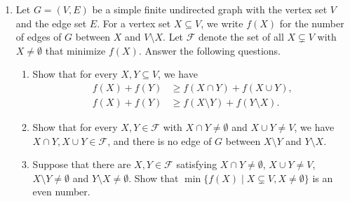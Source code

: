 \documentclass{article}
\begin{document}
\begin{enumerate}[label=\fbox{\arabic*}]
\begin{enumerate}[label=(\arabic*)]
\begin{center}
\begin{minipage}{0.7\textwidth}
\begin{tabbing}
                      \> \textbf{while} $X > 0$ \textbf{do} \\
                      \> \> \textbf{while} $Y > 0$ \textbf{do} \\
                      \> \> \> $Y \leftarrow Y - 1$; $Z \leftarrow Z + 1$; $L \leftarrow \mathbf{cons}(X, \mathbf{cons}(Y, L))$ \\
                      \> \> \textbf{done}; \\
                      \> \> $X \leftarrow X - 1$; $Y \leftarrow Z$ \\
                      \> \textbf{done} \\
                      \textbf{done}
                    \end{tabbing}
                  \end{minipage}
                \end{center}
                Here, $V \leftarrow e$ stands for an operation that assigns the value of expression $e$ to program variable $V$.
        \end{enumerate}

  \item Let $G = (V, E)$ be a simple finite undirected graph with the vertex set $V$ and the edge set $E$. For a vertex set $X \subseteq V$, we write $f(X)$ for the number of edges of $G$ between $X$ and $V \setminus X$. Let $\mathcal{F}$ denote the set of all $X \subsetneq V$ with $X \neq \emptyset$ that minimize $f(X)$. Answer the following questions.
        \begin{enumerate}[label=(\arabic*)]
          \item Show that for every $X, Y \subseteq V$, we have
                \begin{align*}
                  f(X) + f(Y) & \ge f(X \cap Y) + f(X \cup Y),           \\
                  f(X) + f(Y) & \ge f(X \setminus Y) + f(Y \setminus X).
                \end{align*}
          \item Show that for every $X, Y \in \mathcal{F}$ with $X \cap Y \neq \emptyset$ and $X \cup Y \neq V$, we have $X \cap Y, X \cup Y \in \mathcal{F}$, and there is no edge of $G$ between $X \setminus Y$ and $Y \setminus X$.
          \item Suppose that there are $X, Y \in \mathcal{F}$ satisfying $X \cap Y \neq \emptyset$, $X \cup Y \neq V$, $X \setminus Y \neq \emptyset$ and $Y \setminus X \neq \emptyset$. Show that $\min \{ f(X) \mid X \subsetneq V, X \neq \emptyset \}$ is an even number.
        \end{enumerate}


\end{enumerate}
\end{document}
